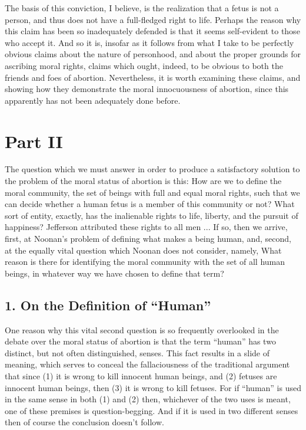 The basis of this conviction, I believe, is the realization
that a fetus is not a person, and thus does not have a
full-fledged right to life. Perhaps the reason why this
claim has been so inadequately defended is that it seems
self-evident to those who accept it. And so it is, insofar as
it follows from what I take to be perfectly obvious claims
about the nature of personhood, and about the proper
grounds for ascribing moral rights, claims which ought,
indeed, to be obvious to both the friends and foes of
abortion. Nevertheless, it is worth examining these
claims, and showing how they demonstrate the moral
innocuousness of abortion, since this apparently has not
been adequately done before.

\section{Part II}

The question which we must answer in order to produce a
satisfactory solution to the problem of the moral status of
abortion is this: How are we to define the moral
community, the set of beings with full and equal moral
rights, such that we can decide whether a human fetus is a
member of this community or not? What sort of entity,
exactly, has the inalienable rights to life, liberty, and the
pursuit of happiness? Jefferson attributed these rights to
all men ... If so, then we arrive, first, at Noonan’s
problem of defining what makes a being human, and,
second, at the equally vital question which Noonan does
not consider, namely, What reason is there for identifying
the moral community with the set of all human beings, in
whatever way we have chosen to define that term?

\subsection{1. On the Definition of “Human”}

One reason why this vital second question is so frequently
overlooked in the debate over the moral status of abortion
is that the term “human” has two distinct, but not often
distinguished, senses. This fact results in a slide of
meaning, which serves to conceal the fallaciousness of the
traditional argument that since (1) it is wrong to kill
innocent human beings, and (2) fetuses are innocent
human beings, then (3) it is wrong to kill fetuses. For if
“human” is used in the same sense in both (1) and (2)
then, whichever of the two uses is meant, one of these
premises is question-begging. And if it is used in two
different senses then of course the conclusion doesn’t
follow.

